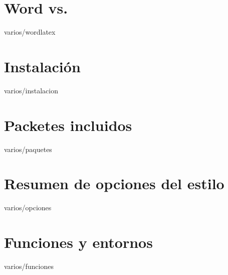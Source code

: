 \documentclass[epsbased,copyright,final,printable,covers,extendedindex,firstnumbered,tfg,gnuplot]{tfgtfmthesisuam}
\begin{document}
\appendix

\chapter{Word\textsuperscript{\textregistered} vs. \LaTeXe\label{CAP:WORDLATEX}}{varios/wordlatex}
\chapter{Instalación\label{CAP:INSTALACION}}{varios/instalacion}
\chapter{Packetes incluidos\label{CAP:PAQUETES}}{varios/paquetes}
\chapter{Resumen de opciones del estilo\label{CAP:OPCIONES}}{varios/opciones}
\chapter{Funciones y entornos\label{CAP:FUNCENT}}{varios/funciones}
\end{document}
